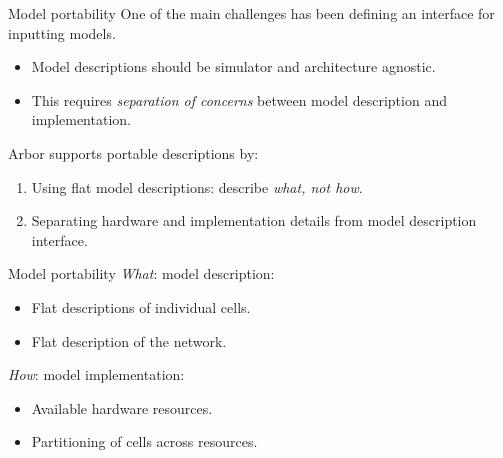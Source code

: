 \documentclass[aspectratio=43]{beamer}
\newcommand{\arbor}{{\ttfamily Arbor}\xspace}
\begin{document}

\begin{frame}[fragile]{Model portability}
    One of the main challenges has been defining an interface for inputting models.
    
    \begin{itemize}
        \item Model descriptions should be simulator and architecture agnostic.
        \item This requires \emph{separation of concerns} between model description and implementation.
    \end{itemize}

    \vspace{10pt}

    \arbor supports portable descriptions by:
    \begin{enumerate}
        \item Using flat model descriptions: describe \emph{what, not how}.
        \item Separating hardware and implementation details from model description interface.
    \end{enumerate}

\end{frame}

\begin{frame}[fragile]{Model portability}
    \emph{What}: model description: 
    \begin{itemize}
        \item Flat descriptions of individual cells. 
        \item Flat description of the network.
    \end{itemize}

    \vspace{10pt}

    \emph{How}: model implementation: 
    \begin{itemize}
        \item Available hardware resources. 
        \item Partitioning of cells across resources. 
    \end{itemize}

\end{frame}
\end{document}
